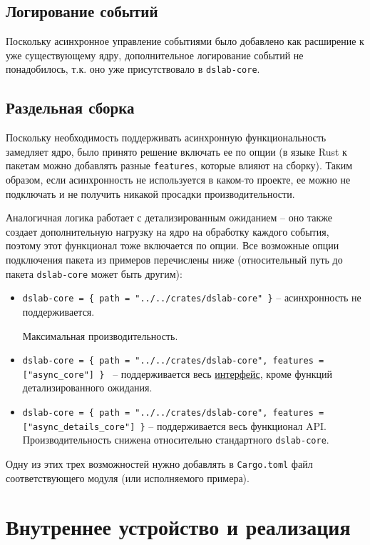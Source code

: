 \subsection{Логирование событий}

Поскольку асинхронное управление событиями было добавлено как расширение к уже существующему ядру, дополнительное логирование событий не понадобилось, т.к. оно уже присутствовало в \texttt{dslab-core}.

\subsection{Раздельная сборка}

Поскольку необходимость поддерживать асинхронную функциональность замедляет ядро, было принято решение включать ее по опции (в языке Rust к пакетам можно добавлять разные \texttt{features}, которые влияют на сборку). Таким образом, если асинхронность не используется в каком-то проекте, ее можно не подключать и не получить никакой просадки производительности. 

Аналогичная логика работает с детализированным ожиданием -- оно также создает дополнительную нагрузку на ядро на обработку каждого события, поэтому этот функционал тоже включается по опции. Все возможные опции подключения пакета из примеров перечислены ниже (относительный путь до пакета \texttt{dslab-core} может быть другим): 
\begin{itemize}
    \item \small \texttt{dslab-core = \{ path = "../../crates/dslab-core" \}} -- асинхронность не поддерживается. 
    
    Максимальная производительность. 
    \item \small \texttt{dslab-core = \{ path = "../../crates/dslab-core", features = ["async\_core"] \} } -- поддерживается весь \hyperref[interface]{интерфейс}, кроме функций детализированного ожидания. 
    \item \small \texttt{dslab-core = \{ path = "../../crates/dslab-core", features = ["async\_details\_core"] \}} -- поддерживается весь функционал API. Производительность снижена относительно стандартного \texttt{dslab-core}.
\end{itemize}

Одну из этих трех возможностей нужно добавлять в \texttt{Cargo.toml} файл соответствующего модуля (или исполняемого примера).


\section{Внутреннее устройство и реализация}

